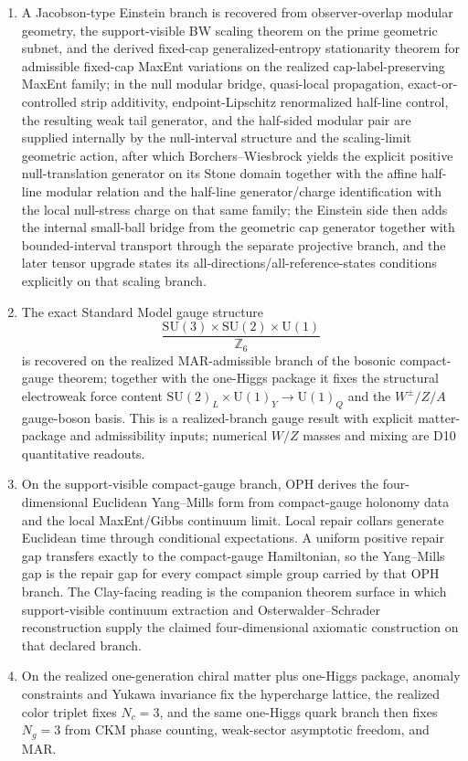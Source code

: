 \documentclass[11pt]{article}
\newcommand{\SU}{\mathrm{SU}}
\newcommand{\U}{\mathrm{U}}
\begin{document}
\begin{enumerate}[leftmargin=2em]
\item A Jacobson-type Einstein branch is recovered from observer-overlap modular geometry, the support-visible BW scaling theorem on the prime geometric subnet, and the derived fixed-cap generalized-entropy stationarity theorem for admissible fixed-cap MaxEnt variations on the realized cap-label-preserving MaxEnt family; in the null modular bridge, quasi-local propagation, exact-or-controlled strip additivity, endpoint-Lipschitz renormalized half-line control, the resulting weak tail generator, and the half-sided modular pair are supplied internally by the null-interval structure and the scaling-limit geometric action, after which Borchers--Wiesbrock yields the explicit positive null-translation generator on its Stone domain together with the affine half-line modular relation and the half-line generator/charge identification with the local null-stress charge on that same family; the Einstein side then adds the internal small-ball bridge from the geometric cap generator together with bounded-interval transport through the separate projective branch, and the later tensor upgrade states its all-directions/all-reference-states conditions explicitly on that scaling branch.
\item The exact Standard Model gauge structure
\[
\frac{\SU(3)\times\SU(2)\times\U(1)}{\mathbb Z_6}
\]
is recovered on the realized MAR-admissible branch of the bosonic compact-gauge theorem; together with the one-Higgs package it fixes the structural electroweak force content \(\SU(2)_L\times\U(1)_Y\to\U(1)_Q\) and the \(W^\pm/Z/A\) gauge-boson basis. This is a realized-branch gauge result with explicit matter-package and admissibility inputs; numerical \(W/Z\) masses and mixing are D10 quantitative readouts.
\item On the support-visible compact-gauge branch, OPH derives the four-dimensional
Euclidean Yang--Mills form from compact-gauge holonomy data and the local MaxEnt/Gibbs
continuum limit. Local repair collars generate Euclidean time through conditional
expectations. A uniform positive repair gap transfers exactly to the compact-gauge Hamiltonian, so
the Yang--Mills gap is the repair gap for every compact simple group carried by that OPH branch.
The Clay-facing reading is the companion theorem surface in which support-visible continuum
extraction and Osterwalder--Schrader reconstruction supply the claimed four-dimensional axiomatic
construction on that declared branch.
\item On the realized one-generation chiral matter plus one-Higgs package, anomaly constraints and Yukawa invariance fix the hypercharge lattice, the realized color triplet fixes \(N_c=3\), and the same one-Higgs quark branch then fixes \(N_g=3\) from CKM phase counting, weak-sector asymptotic freedom, and MAR.

\end{enumerate}
\end{document}
